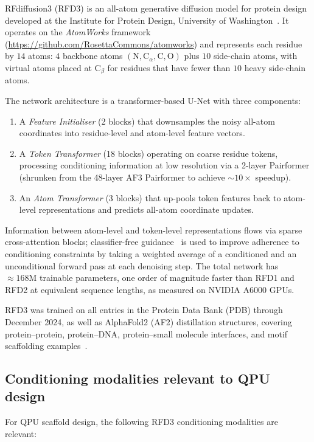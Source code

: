 \documentclass[11pt,oneside]{amsbook}
\numberwithin{equation}{section}
\theoremstyle{plain}
\theoremstyle{definition}
\theoremstyle{remark}
\begin{document}
RFdiffusion3 (RFD3) is an all-atom generative diffusion model for protein design
developed at the Institute for Protein Design, University of
Washington~\cite{ButcherEtAl2025}.  It operates on the
\emph{AtomWorks} framework (\url{https://github.com/RosettaCommons/atomworks})
and represents each residue by $14$ atoms: $4$ backbone atoms
$(\text{N}, \text{C}_\alpha, \text{C}, \text{O})$ plus $10$ side-chain atoms,
with virtual atoms placed at $\text{C}_\beta$ for residues that have fewer than
$10$ heavy side-chain atoms.

The network architecture is a transformer-based U-Net with three components:
\begin{enumerate}
\item A \emph{Feature Initialiser} (2 blocks) that downsamples the noisy
      all-atom coordinates into residue-level and atom-level feature vectors.
\item A \emph{Token Transformer} (18 blocks) operating on coarse residue tokens,
      processing conditioning information at low resolution via a 2-layer
      Pairformer (shrunken from the 48-layer AF3 Pairformer to achieve $\sim
      10\times$ speedup).
\item An \emph{Atom Transformer} (3 blocks) that up-pools token features back
      to atom-level representations and predicts all-atom coordinate updates.
\end{enumerate}
Information between atom-level and token-level representations flows via sparse
cross-attention blocks; classifier-free guidance~\cite{HoSalimans2022} is used
to improve adherence to conditioning constraints by taking a weighted average of
a conditioned and an unconditional forward pass at each denoising step.  The
total network has $\approx 168\text{M}$ trainable parameters, one order of magnitude
faster than RFD1 and RFD2 at equivalent sequence lengths, as measured on NVIDIA
A6000 GPUs.

RFD3 was trained on all entries in the Protein Data Bank (PDB) through December
2024, as well as AlphaFold2 (AF2) distillation structures, covering
protein--protein, protein--DNA, protein--small molecule interfaces, and motif
scaffolding examples~\cite{ButcherEtAl2025}.

\subsection{Conditioning modalities relevant to QPU design}
\label{subsec:pqpu_conditioning}

For QPU scaffold design, the following RFD3 conditioning modalities are
relevant:
\end{document}
